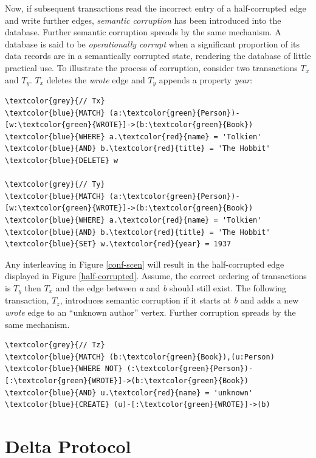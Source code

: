 \documentclass[sigplan,10pt]{acmart}
\newcommand{\tDelta}{\textsf{Delta}\xspace}
\begin{document}
Now, if subsequent transactions read the incorrect entry of a half-corrupted edge and write further edges, \emph{semantic corruption} has been introduced into the database. Further semantic corruption spreads by the same mechanism. A database is said to be \emph{operationally corrupt} when a significant proportion of its data records are in a semantically corrupted state, rendering the database of little practical use. To illustrate the process of corruption, consider two transactions $T_x$ and $T_y$. $T_x$ deletes the \emph{wrote} edge and $T_y$ appends a property \emph{year}:
\begin{Verbatim}[commandchars=\\\{\},fontsize=\small,xleftmargin=.2in]
\textcolor{grey}{// Tx}
\textcolor{blue}{MATCH} (a:\textcolor{green}{Person})-[w:\textcolor{green}{WROTE}]->(b:\textcolor{green}{Book})
\textcolor{blue}{WHERE} a.\textcolor{red}{name} = 'Tolkien' \textcolor{blue}{AND} b.\textcolor{red}{title} = 'The Hobbit'
\textcolor{blue}{DELETE} w

\textcolor{grey}{// Ty}
\textcolor{blue}{MATCH} (a:\textcolor{green}{Person})-[w:\textcolor{green}{WROTE}]->(b:\textcolor{green}{Book})
\textcolor{blue}{WHERE} a.\textcolor{red}{name} = 'Tolkien' \textcolor{blue}{AND} b.\textcolor{red}{title} = 'The Hobbit'
\textcolor{blue}{SET} w.\textcolor{red}{year} = 1937
\end{Verbatim}
Any interleaving in Figure \ref{conf-scen} will result in the half-corrupted edge displayed in Figure \ref{half-corrupted}. Assume, the correct ordering of transactions is $T_y$ then $T_x$ and the edge between \emph{a} and \emph{b} should still exist. The following transaction, $T_z$, introduces semantic corruption if it starts at \emph{b} and adds a new \emph{wrote} edge to an ``unknown author'' vertex. Further corruption spreads by the same mechanism.

\begin{Verbatim}[commandchars=\\\{\},fontsize=\small,xleftmargin=.2in]
\textcolor{grey}{// Tz}
\textcolor{blue}{MATCH} (b:\textcolor{green}{Book}),(u:Person)
\textcolor{blue}{WHERE NOT} (:\textcolor{green}{Person})-[:\textcolor{green}{WROTE}]->(b:\textcolor{green}{Book})
\textcolor{blue}{AND} u.\textcolor{red}{name} = 'unknown'
\textcolor{blue}{CREATE} (u)-[:\textcolor{green}{WROTE}]->(b)
\end{Verbatim}



\section{\tDelta Protocol}
\label{sec:tdelta-protocol}
\end{document}

